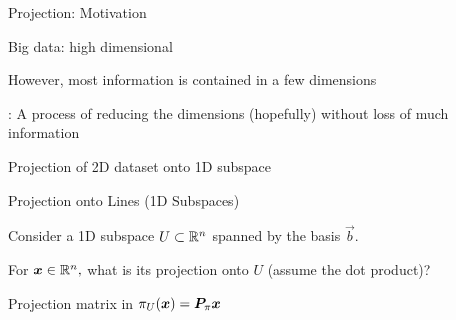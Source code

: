 \documentclass[fleqn,aspectratio=169]{beamer}
\begin{document}
\begin{frame}{Projection: Motivation}

\plitemsep 0.05in

\bci 

\item Big data: high dimensional

\item However, most information is contained in a few dimensions

\item {}: A process of reducing the dimensions (hopefully) without loss of much information

\item \exam Projection of 2D dataset onto 1D subspace

\centering
{}
\eci


\end{frame}

\begin{frame}{Projection onto Lines (1D Subspaces)}

\plitemsep 0.1in

\bci 
\item Consider a 1D subspace $U \subset {\mathbb R}^n$ spanned by the basis $\vec{b}.$ 

\item For $\bm{x} \in {\mathbb R}^{n},$ what is its projection  onto $U$ (assume the dot product)?
{
\small
{}
}
{
\vspace{-0.2cm}
}
\vspace{-0.5cm}
\item Projection matrix   in $\pi_U(\bm{x}) = \bm{P}_\pi \bm{x}$
\eci

\end{frame}
\end{document}
